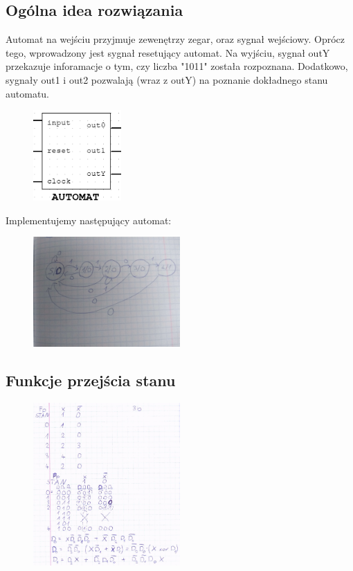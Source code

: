 \documentclass{article}
\begin{document}
\subsection{Ogólna idea rozwiązania}
Automat na wejściu przyjmuje zewenętrzy zegar, oraz sygnał wejściowy.
Oprócz tego, wprowadzony jest sygnał resetujący automat.
Na wyjściu, sygnał outY przekazuje inforamacje o tym, czy liczba "1011" została rozpoznana.
Dodatkowo, sygnały out1 i out2 pozwalają (wraz z outY) na poznanie dokładnego stanu automatu.
\begin{figure}[H]
\includegraphics[width = 0.3\textwidth]{3b_blackbox}
\end{figure}
Implementujemy następujący automat:
\begin{figure}[H]
\includegraphics[width = 0.5\textwidth]{3b_automat}
\end{figure}
\subsection{Funkcje przejścia stanu}
\begin{figure}[H]
\includegraphics[width = 0.5\textwidth]{3b_przejscia}
\end{figure}
\end{document}

